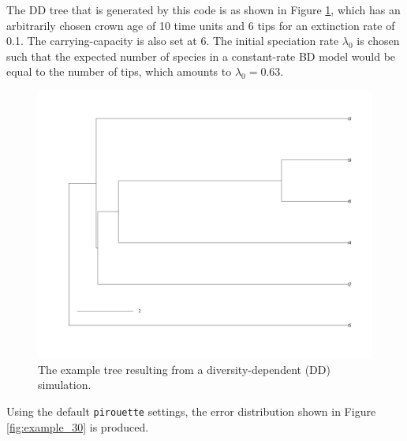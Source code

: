 The DD tree that is generated by this code is as shown in Figure \ref{fig:dd_tree},
which has an arbitrarily chosen crown age of 10 time units and 6 tips for an extinction rate of 0.1. The carrying-capacity is also set at 6. The initial speciation rate $\lambda_0$ is chosen such that the expected number of species in a constant-rate BD model would be equal to the number of tips, which amounts to $\lambda_0 = 0.63$.

\begin{figure}[H]
  \includegraphics[width=\textwidth]{pirouette_example_30/example_30_314/true_tree.png}
  \caption{
    The example tree resulting from a diversity-dependent (DD) simulation.
  }
  \label{fig:dd_tree}
\end{figure}

Using the default \verb;pirouette; settings,
the error distribution shown in Figure \ref{fig:example_30}
is produced.

